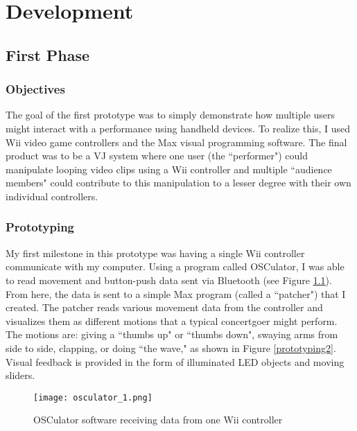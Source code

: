 \chapter{Development}


\section{First Phase}

\subsection{Objectives}

The goal of the first prototype was to simply demonstrate how multiple users might interact with a performance using handheld devices. To realize this, I used Wii video game controllers and the Max visual programming software. The final product was to be a VJ system where one user (the ``performer") could manipulate looping video clips using a Wii controller and multiple ``audience members" could contribute to this manipulation to a lesser degree with their own individual controllers.

\subsection{Prototyping}

My first milestone in this prototype was having a single Wii controller communicate with my computer. Using a program called OSCulator, I was able to read movement and button-push data sent via Bluetooth (see Figure \ref{prototyping1}). From here, the data is sent to a simple Max program (called a ``patcher") that I created. The patcher reads various movement data from the controller and visualizes them as different motions that a typical concertgoer might perform. The motions are: giving a ``thumbs up" or ``thumbs down", swaying arms from side to side, clapping, or doing ``the wave," as shown in Figure \ref{prototyping2}. Visual feedback is provided in the form of illuminated LED objects and moving sliders.

\begin{figure}[t]
	\centering

	\texttt{[image: osculator\_1.png]}
	\caption{OSCulator software receiving data from one Wii controller}

	\label{prototyping1}
\end{figure}

